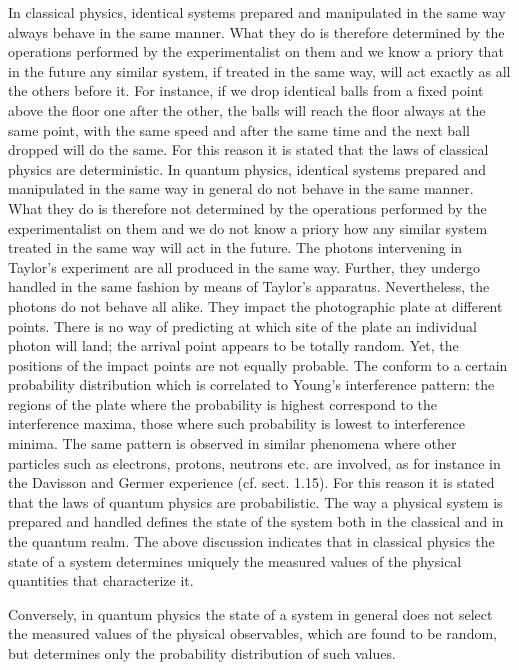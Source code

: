 \documentclass{article}
\begin{document}
In classical physics, identical systems prepared and manipulated in the same way always behave in the same manner. What they do is therefore determined by the operations performed by the experimentalist on them and we know a priory that in the future any similar system, if treated in the same way, will act exactly as all the others before it. For instance, if we drop identical balls from a fixed point above the floor one after the other, the balls will reach the floor always at the same point, with the same speed and after the same time and the next ball dropped will do the same. For this reason it is stated that
the laws of classical physics are deterministic.
In quantum physics, identical systems prepared and manipulated in the same way in general do not behave in the same manner. What they do is therefore not determined by the operations performed by the experimentalist on them and we do not know a priory how any similar system treated in the same way will act in the future. The photons intervening in Taylor's experiment are all produced in the same way. Further, they undergo handled in the same fashion by means of Taylor's apparatus. Nevertheless, the photons do not behave all alike. They impact the photographic plate at different points. There is no way of predicting at which site of the plate an individual photon will land; the arrival point appears to be totally random. Yet, the positions of the impact points are not equally probable. The conform to a certain probability distribution which is correlated to Young's interference pattern: the regions of the plate where the probability is highest correspond to the interference maxima, those where such
probability is lowest to interference minima. The same pattern is observed in similar phenomena where other particles such as electrons, protons, neutrons etc. are involved, as for instance in the Davisson and Germer experience (cf. sect. 1.15). For this reason it is stated that
the laws of quantum physics are probabilistic.
The way a physical system is prepared and handled defines the state of the system both in the classical and in the quantum realm. The above discussion indicates that
in classical physics the state of a system determines uniquely the measured values of the physical quantities that characterize it.

Conversely,
in quantum physics the state of a system in general does not select the measured values of the physical observables, which are found to be random, but determines only the probability distribution of such values.
\end{document}
